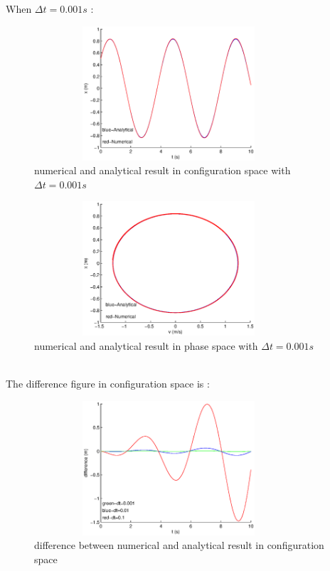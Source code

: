 \documentclass{article}
\begin{document}
\newpage
\noindent When $\Delta t=0.001s$ :
\begin{figure}[!htb]
	\begin{center}
		\includegraphics[height=5cm,width=10cm]{Problem2_3configuration}
	\end{center}
	\caption{numerical and analytical result in configuration space with $\Delta t=0.001s$}
\end{figure}
\begin{figure}[!htb]
	\begin{center}
		\includegraphics[height=5cm,width=10cm]{Problem2_3phase}
	\end{center}
	\caption{numerical and analytical result in phase space with $\Delta t=0.001s$}
\end{figure}
\\The difference figure in configuration space is :
\begin{figure}[!htb]
	\begin{center}
		\includegraphics[height=5cm,width=10cm]{Problem2differenceconfiguration}
	\end{center}
	\caption{difference between numerical and analytical result in configuration space}
\end{figure}
\end{document}
